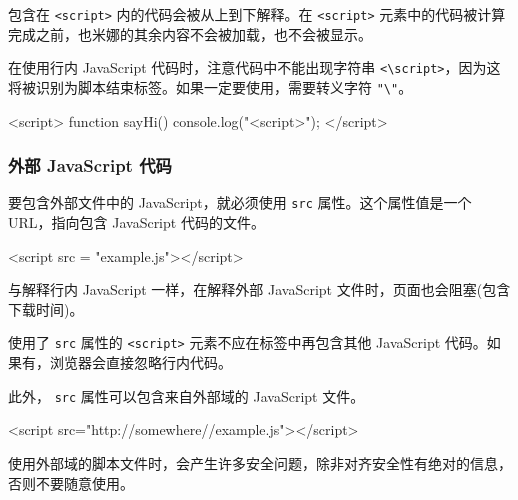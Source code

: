 包含在 \texttt{<script>} 内的代码会被从上到下解释。在  \texttt{<script>} 元素中的代码被计算完成之前，也米娜的其余内容不会被加载，也不会被显示。

在使用行内 JavaScript 代码时，注意代码中不能出现字符串  \texttt{<\textbackslash script>}，因为这将被识别为脚本结束标签。如果一定要使用，需要转义字符 \texttt{"\textbackslash"}。

\begin{HTML}
<script>
    function sayHi() {
        console.log("<\/script>");
    }
</script>
\end{HTML}

\subsubsection{外部 JavaScript 代码}

要包含外部文件中的 JavaScript，就必须使用 \texttt{src} 属性。这个属性值是一个 URL，指向包含 JavaScript 代码的文件。

\begin{HTML}
<script src = "example.js"></script>
\end{HTML}

与解释行内 JavaScript 一样，在解释外部 JavaScript 文件时，页面也会阻塞(包含下载时间)。


使用了 \texttt{src} 属性的 \texttt{<script>} 元素不应在标签中再包含其他 JavaScript 代码。如果有，浏览器会直接忽略行内代码。

此外， \texttt{src} 属性可以包含来自外部域的 JavaScript 文件。

\begin{HTML}
<script src="http://somewhere//example.js"></script>
\end{HTML}

使用外部域的脚本文件时，会产生许多安全问题，除非对齐安全性有绝对的信息，否则不要随意使用。



